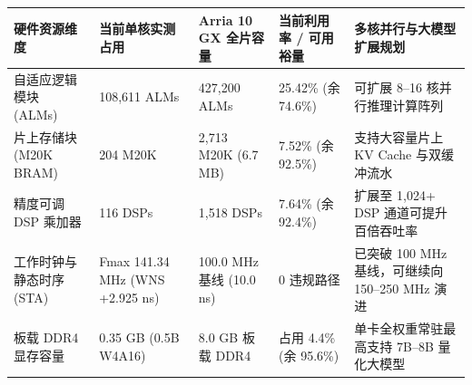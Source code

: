 \documentclass[11pt,a4paper]{article}
\begin{document}
{\footnotesize\renewcommand{\arraystretch}{1.14}\begin{longtable}{@{}L{0.19\textwidth}L{0.16\textwidth}L{0.16\textwidth}L{0.15\textwidth}L{0.24\textwidth}@{}}\toprule

\textbf{硬件资源维度} & \textbf{当前单核实测占用} & \textbf{Arria 10 GX 全片容量} & \textbf{当前利用率 /\allowbreak{} 可用裕量} & \textbf{多核并行与大模型扩展规划}\\\midrule\endhead

自适应逻辑模块 (\allowbreak{}ALMs)\allowbreak{} & 108,\allowbreak{}611 ALMs & 427,\allowbreak{}200 ALMs & 25.42\% (\allowbreak{}余 74.6\%)\allowbreak{} & 可扩展 8–16 核并行推理计算阵列\\[2pt]

片上存储块 (\allowbreak{}M20K BRAM)\allowbreak{} & 204 M20K & 2,\allowbreak{}713 M20K (\allowbreak{}6.7 MB)\allowbreak{} & 7.52\% (\allowbreak{}余 92.5\%)\allowbreak{} & 支持大容量片上 KV Cache 与双缓冲流水\\[2pt]

精度可调 DSP 乘加器 & 116 DSPs & 1,\allowbreak{}518 DSPs & 7.64\% (\allowbreak{}余 92.4\%)\allowbreak{} & 扩展至 1,\allowbreak{}024+\allowbreak{} DSP 通道可提升百倍吞吐率\\[2pt]

工作时钟与静态时序 (\allowbreak{}STA)\allowbreak{} & Fmax 141.34 MHz (\allowbreak{}WNS +\allowbreak{}2.925 ns)\allowbreak{} & 100.0 MHz 基线 (\allowbreak{}10.0 ns)\allowbreak{} & 0 违规路径 & 已突破 100 MHz 基线，可继续向 150–250 MHz 演进\\[2pt]

板载 DDR4 显存容量 & 0.35 GB (\allowbreak{}0.5B W4A16)\allowbreak{} & 8.0 GB 板载 DDR4 & 占用 4.4\% (\allowbreak{}余 95.6\%)\allowbreak{} & 单卡全权重常驻最高支持 7B–8B 量化大模型\\[2pt]

\bottomrule\end{longtable}}
\end{document}
